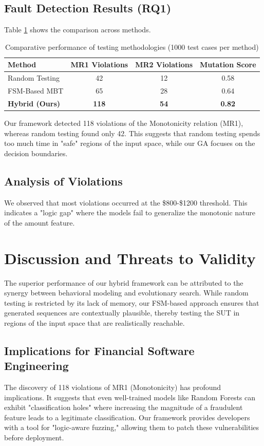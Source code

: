\documentclass[review]{elsarticle}
\begin{document}
\subsection{Fault Detection Results (RQ1)}
Table \ref{tab:results} shows the comparison across methods.

\begin{table}[h]
\centering
\caption{Comparative performance of testing methodologies (1000 test cases per method)}
\label{tab:results}
\begin{tabular}{lccc}
\toprule
Method & MR1 Violations & MR2 Violations & Mutation Score \\ \midrule
Random Testing & 42 & 12 & 0.58 \\
FSM-Based MBT & 65 & 28 & 0.64 \\
\textbf{Hybrid (Ours)} & \textbf{118} & \textbf{54} & \textbf{0.82} \\ \bottomrule
\end{tabular}
\end{table}

Our framework detected 118 violations of the Monotonicity relation (MR1), whereas random testing found only 42. This suggests that random testing spends too much time in "safe" regions of the input space, while our GA focuses on the decision boundaries.

\subsection{Analysis of Violations}
We observed that most violations occurred at the \$800-\$1200 threshold. This indicates a "logic gap" where the models fail to generalize the monotonic nature of the amount feature.

\section{Discussion and Threats to Validity}
The superior performance of our hybrid framework can be attributed to the synergy between behavioral modeling and evolutionary search. While random testing is restricted by its lack of memory, our FSM-based approach ensures that generated sequences are contextually plausible, thereby testing the SUT in regions of the input space that are realistically reachable.

\subsection{Implications for Financial Software Engineering}
The discovery of 118 violations of MR1 (Monotonicity) has profound implications. It suggests that even well-trained models like Random Forests can exhibit "classification holes" where increasing the magnitude of a fraudulent feature leads to a legitimate classification. Our framework provides developers with a tool for "logic-aware fuzzing," allowing them to patch these vulnerabilities before deployment.
\end{document}
